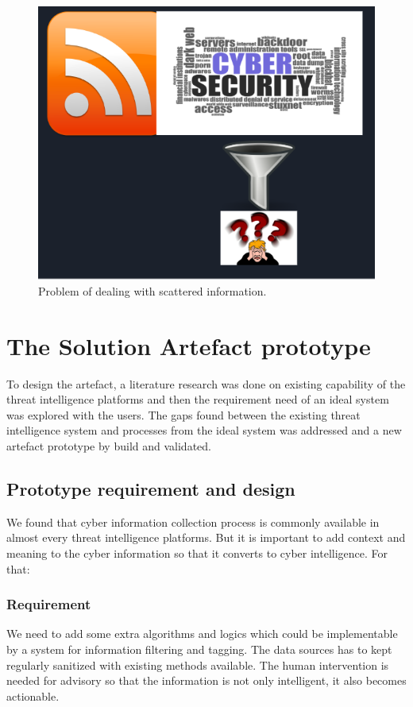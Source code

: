 \begin{figure}
\centering
    \includegraphics[scale=0.3]{Figures/problem}
    \caption{Problem of dealing with scattered information.}
    \label{fig:problem_exsum}
\end{figure}


\section{The Solution Artefact prototype }
To design the artefact, a literature research was done on existing capability of the threat intelligence platforms and then the requirement need of an ideal system was explored with the users. The gaps found between the existing threat intelligence system and processes from the ideal system was addressed and a new artefact prototype by build and validated. 
\subsection{Prototype requirement and design}
We found that cyber information collection process is commonly available in almost every threat intelligence platforms. But it is important to add context and meaning to the cyber information so that it converts to cyber intelligence. For that:
\subsubsection{Requirement}
We need to add some extra algorithms and logics which could be implementable by a system for information filtering and tagging.
The data sources has to kept regularly sanitized with existing methods available.
The human intervention is needed for advisory so that the information is not only intelligent, it also becomes actionable.
